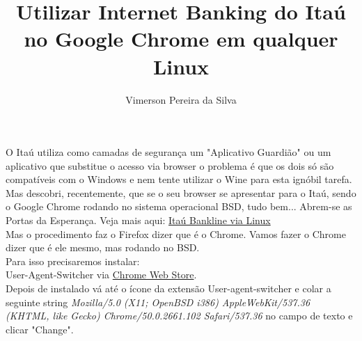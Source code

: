 \documentclass[10pt,a4paper]{article}
\title{Utilizar Internet Banking do Itaú no Google Chrome em qualquer Linux}
\author{Vimerson Pereira da Silva}
\begin{document}
\maketitle
O Itaú utiliza como camadas de segurança um "Aplicativo Guardião" ou um aplicativo que substitue o acesso via browser o problema é que os dois só são compatíveis com o Windows e nem tente utilizar o Wine para esta ignóbil tarefa.\\

Mas descobri, recentemente, que se o seu browser se apresentar para o Itaú, sendo o Google Chrome rodando no sistema operacional BSD, tudo bem... Abrem-se as Portas da Esperança. Veja mais aqui: \href{https://www.vivaolinux.com.br/dica/Acessar-site-do-Itau-Banco-de-qualquer-Linux-2016}{Itaú Bankline via Linux}\\

Mas o procedimento faz o Firefox dizer que é o Chrome. Vamos fazer o Chrome dizer que é ele mesmo, mas rodando no BSD.\\
Para isso precisaremos instalar:\\
User-Agent-Switcher via 
\href{https://chrome.google.com/webstore/detail/user-agent-switcher/lkmofgnohbedopheiphabfhfjgkhfcgf?utm_source=chrome-app-launcher-info-dialog}{Chrome Web Store}.\\

Depois de instalado vá até o ícone da extensão User-agent-switcher e colar a seguinte string \textit{Mozilla/5.0 (X11; OpenBSD i386) AppleWebKit/537.36 (KHTML, like Gecko) Chrome/50.0.2661.102 Safari/537.36} no campo de texto e clicar "Change".
\end{document}
